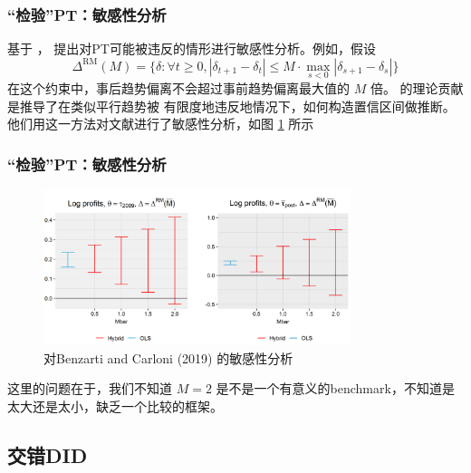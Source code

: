 \documentclass[../didNotes.tex]{subfiles}
\begin{document}
\begin{frame}
  \frametitle{``检验''PT：敏感性分析}

  基于 \textcite{roth2022}，\textcite{rambachan2023} 提出对PT可能被违反的情形进行敏感性分析。例如，假设
  $$
  \Delta^{\text{RM}}(M) = \{ \delta: \forall t \ge 0,\left\vert \delta_{t+1}-\delta_{t} \right\vert \le M \cdot
  \max_{s<0} \left\vert \delta_{s+1}-\delta_{s} \right\vert  \}
  $$
  在这个约束中，事后趋势偏离不会超过事前趋势偏离最大值的 $M$ 倍。\textcite{rambachan2023} 的理论贡献是推导了在类似平行趋势被
  有限度地违反地情况下，如何构造置信区间做推断。他们用这一方法对文献进行了敏感性分析，如图 \ref{pic:PT_sensitivity} 所示

\end{frame}

\begin{frame}
  \frametitle{``检验''PT：敏感性分析}

  \begin{figure}[htbp]
    \begin{center}
      \includegraphics[width=0.8\textwidth]{./assets/PT_sensitivity.png}
    \end{center}
    \caption{对Benzarti and Carloni (2019) 的敏感性分析}
    \label{pic:PT_sensitivity}
  \end{figure}

  这里的问题在于，我们不知道 $M=2$ 是不是一个有意义的benchmark，不知道是太大还是太小，缺乏一个比较的框架。
\end{frame}

\subsection{交错DID}
\end{document}
